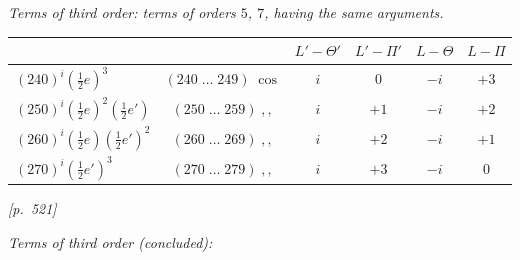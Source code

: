 \documentclass[11pt]{article}
\begin{document}
\medskip

\textit{Terms of third order: terms of orders $5$, $7$, having the same arguments.}

\smallskip

\begin{center}
\begin{tabular}{|l|c|c|c|c|c|}
\hline
 & & $L'-\Theta'$ & $L'-\Pi'$ & $L-\Theta$ & $L-\Pi$ \\
\hline
$(240)^i(\tfrac{1}{2}e)^3$ & $(240\;\ldots\;249)\;\cos$ & $i$ & $0$ & $-i$ & $+3$ \\
$(250)^i(\tfrac{1}{2}e)^2(\tfrac{1}{2}e')$ & $(250\;\ldots\;259)\;,,$ & $i$ & $+1$ & $-i$ & $+2$ \\
$(260)^i(\tfrac{1}{2}e)(\tfrac{1}{2}e')^2$ & $(260\;\ldots\;269)\;,,$ & $i$ & $+2$ & $-i$ & $+1$ \\
$(270)^i(\tfrac{1}{2}e')^3$ & $(270\;\ldots\;279)\;,,$ & $i$ & $+3$ & $-i$ & $0$ \\
\hline
\end{tabular}
\end{center}


\newpage
\noindent\textit{[p.~521]}

\medskip

\begin{center}
\textit{Terms of third order (concluded):}
\end{center}

\smallskip
\end{document}

